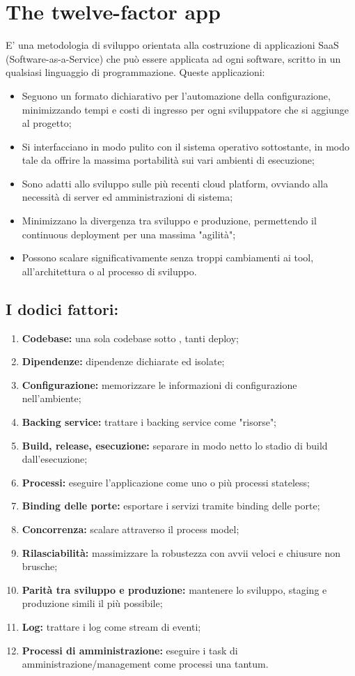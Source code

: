 \documentclass[PianoDiQualifica.tex]{subfiles}
\begin{document}
\chapter{The twelve-factor app}
E' una metodologia di sviluppo orientata alla costruzione di applicazioni SaaS (Software-as-a-Service) che può essere applicata ad ogni software, scritto in un qualsiasi linguaggio di programmazione.
Queste applicazioni:
\begin{itemize}
\item Seguono un formato dichiarativo per l'automazione della configurazione, minimizzando tempi e costi di ingresso per ogni sviluppatore che si aggiunge al progetto;
\item Si interfacciano in modo pulito con il sistema operativo sottostante, in modo tale da offrire la massima portabilità sui vari ambienti di esecuzione;
\item Sono adatti allo sviluppo sulle più recenti cloud platform, ovviando alla necessità di server ed amministrazioni di sistema;
\item Minimizzano la divergenza tra sviluppo e produzione, permettendo il continuous deployment per una massima "agilità";
\item Possono scalare significativamente senza troppi cambiamenti ai tool, all'architettura o al processo di sviluppo.
\end{itemize}

\section{I dodici fattori:}
\begin{enumerate}
\item \textbf{Codebase:} una sola codebase sotto , tanti deploy;
\item \textbf{Dipendenze:} dipendenze dichiarate ed isolate;
\item \textbf{Configurazione:} memorizzare le informazioni di configurazione nell'ambiente;
\item \textbf{Backing service:} trattare i backing service come "risorse";
\item \textbf{Build, release, esecuzione:} separare in modo netto lo stadio di build dall'esecuzione;
\item \textbf{Processi:} eseguire l'applicazione come uno o più processi stateless;
\item \textbf{Binding delle porte:} esportare i servizi tramite binding delle porte;
\item \textbf{Concorrenza:} scalare attraverso il process model;
\item \textbf{Rilasciabilità:} massimizzare la robustezza con avvii veloci e chiusure non brusche;
\item \textbf{Parità tra sviluppo e produzione:} mantenere lo sviluppo, staging e produzione simili il più possibile;
\item \textbf{Log:} trattare i log come stream di eventi;
\item \textbf{Processi di amministrazione:} eseguire i task di amministrazione/management come processi una tantum.
\end{enumerate}
\end{document}
